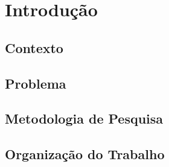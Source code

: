 \chapter{Introdução}
\section{Contexto}
\section{Problema}
\section{Metodologia de Pesquisa}
\section{Organização do Trabalho}
